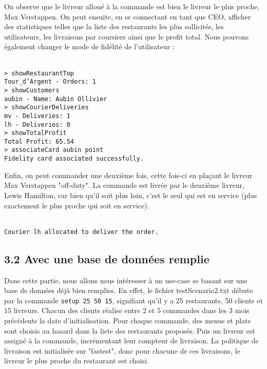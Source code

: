 On observe que le livreur alloué à la commande est bien le livreur le plus proche, Max Verstappen. On peut ensuite, en se connectant en tant que CEO, afficher des statistiques telles que la liste des restaurants les plus sollicités, les utilisateurs, les livraisons par coursiers ainsi que le profit total. Nous pouvons également changer le mode de fidélité de l'utilisateur :

\texttt{\\
> showRestaurantTop\\
Tour\_d'Argent - Orders: 1\\
> showCustomers\\
aubin - Name: Aubin Ollivier\\
> showCourierDeliveries\\
mv - Deliveries: 1\\
lh - Deliveries: 0\\
> showTotalProfit\\
Total Profit: 65.54\\
> associateCard aubin point\\
Fidelity card associated successfully.\\
}

Enfin, on peut commander une deuxième fois, cette fois-ci en plaçant le livreur Max Verstappen "off-duty". La commande est livrée par le deuxième livreur, Lewis Hamilton, car bien qu'il soit plus loin, c'est le seul qui est en service (plus exactement le plus proche qui soit en service).

\texttt{\\
Courier lh allocated to deliver the order.}

\subsection*{3.2 Avec une base de données remplie}

Dans cette partie, nous allons nous intéresser à un use-case se basant sur une base de données déjà bien remplies. En effet, le fichier testScenario2.txt débute par la commande \texttt{setup 25 50 15}, signifiant qu'il y a 25 restaurants, 50 clients et 15 livreurs. Chacun des clients réalise entre 2 et 5 commandes dans les 3 mois précédents la date d'initialisation. Pour chaque commande, des menus et plats sont choisis au hasard dans la liste des restaurants proposés. Puis un livreur est assigné à la commande, incrémentant leur compteur de livraison. La politique de livraison est initialisée sur "fastest", donc pour chacune de ces livraisons, le livreur le plus proche du restaurant est choisi. \\

